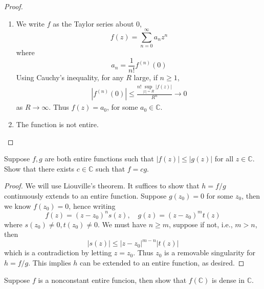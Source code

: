 \documentclass[openany]{book}
\newcommand{\C}{\mathbb{C}}
\begin{document}
\begin{proof}
    \begin{enumerate}
        \item[(a)] We write $f$ as the Taylor series about $0$, 
        \begin{equation*}
            f(z)=\sum_{n=0}^\infty a_nz^n
        \end{equation*}
        where 
        \begin{equation*}
            a_n=\frac{1}{n!}f^{(n)}(0)
        \end{equation*}
        Using Cauchy's inequality, for any $R$ large, if $n\geq 1$,
        \begin{align*}
            |f^{(n)}(0)|\leq\frac{n!\sup_{|z|=R}|f(z)|}{R^n}\to 0
        \end{align*}
        as $R\to\infty$. Thus $f(z)=a_0$, for some $a_0\in\C$.
        \item[(b)] The function is not entire.
    \end{enumerate}
\end{proof}


\begin{prob}[Fall 2018, Q4]
    Suppose $f,g$ are both entire functions such that $|f(z)|\leq |g(z)|$ for all $z\in\C$. Show that there exists $c\in\C$ such that $f=cg$.
\end{prob}

\begin{proof}
    We will use Liouville's theorem. It suffices to show that $h=f/g$ continuously extends to an entire function. Suppose $g(z_0)=0$ for some $z_0$, then we know $f(z_0)=0$, hence writing 
    \begin{equation*}
        f(z)=(z-z_0)^ns(z), \quad g(z)=(z-z_0)^m t(z)
    \end{equation*}
    where $s(z_0)\neq 0, t(z_0)\neq 0$. We must have $n\geq m$, suppose if not, i.e., $m>n$, then 
    \begin{equation*}
        |s(z)|\leq|z-z_0|^{m-n}|t(z)|
    \end{equation*}
    which is a contradiction by letting $z=z_0$. Thus $z_0$ is a removable singularity for $h=f/g$. This implies $h$ can be extended to an entire function, as desired.
\end{proof}



\begin{prob}[Spring 2015, Q6]
    Suppose $f$ is a nonconstant entire funcion, then show that $f(\C)$ is dense in $\C$.
\end{prob}
\end{document}
